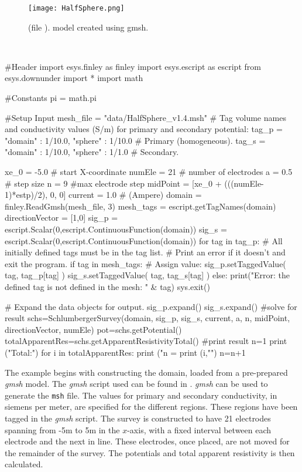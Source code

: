 \begin{figure}
\centering
\texttt{[image: HalfSphere.png]}
\caption{
    (file ). model created using gmsh.}
\label{fig:HalfSphere}
\end{figure}

\begin{pyc}\label{code: dc1}
\
\begin{python}
#Header
import esys.finley      as finley
import esys.escript     as escript
from esys.downunder     import *
import math

#Constants
pi = math.pi

#Setup Input
mesh_file = "data/HalfSphere_v1.4.msh"
# Tag volume names and conductivity values (S/m) for primary and secondary potential:
tag_p = {"domain" : 1/10.0, "sphere" :  1/10.0} # Primary (homogeneous).
tag_s = {"domain" : 1/10.0, "sphere" :  1/1.0 } # Secondary.

xe_0 = -5.0 # start X-coordinate
numEle =  21  # number of electrodes
a =  0.5 # step size
n = 9 #max electrode step
midPoint = [xe_0 + (((numEle-1)*estp)/2), 0, 0]
current = 1.0 # (Ampere)
domain = finley.ReadGmsh(mesh_file, 3)
mesh_tags = escript.getTagNames(domain)
directionVector = [1,0]
sig_p = escript.Scalar(0,escript.ContinuousFunction(domain))
sig_s = escript.Scalar(0,escript.ContinuousFunction(domain))
for tag in tag_p:
    # All initially defined tags must be in the tag list.
    # Print an error if it doesn't and exit the program.
    if tag in mesh_tags:
        # Assign value:
        sig_p.setTaggedValue( tag, tag_p[tag] )
        sig_s.setTaggedValue( tag, tag_s[tag] )
    else:
        print("Error: the defined tag is not defined in the mesh: " & tag)
        sys.exit()

# Expand the data objects for output.
sig_p.expand()
sig_s.expand()
#solve for result
schs=SchlumbergerSurvey(domain, sig_p, sig_s, current, a, n, midPoint, directionVector, numEle)
pot=schs.getPotential()
totalApparentRes=schs.getApparentResistivityTotal()
#print result
n=1
print ("Total:\n")
for i in totalApparentRes:
    print ("n = %
    print (i,"\n")
    n=n+1
\end{python}
\end{pyc}


The example begins with constructing the domain, loaded from a pre-prepared
\emph{gmsh} model. The \emph{gmsh} script used can be found in .
\emph{gmsh} can be used to generate the \texttt{msh} file. The values for primary and secondary 
conductivity, in siemens per meter, are specified for the different regions. These regions have been tagged
in the \emph{gmsh} script. The survey is constructed to have 21 electrodes spanning from -5m to 5m
in the $x$-axis, with a fixed interval between each electrode and the next in 
line. These electrodes, once placed, are not moved for the remainder of the
survey. The potentials and total apparent resistivity is then calculated.

